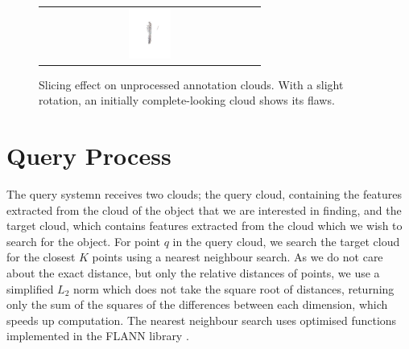 \documentclass[11pt,a4paper]{kth-mag}
\begin{document}
\begin{figure}
{\begin{tabular}{c}
      \includegraphics[width=0.2\textwidth]{images/annotations/slices/hanger_jacket_side}
    \end{tabular}
  }
  \caption{Slicing effect on unprocessed annotation clouds. With a slight
    rotation, an initially complete-looking cloud shows its
    flaws.}
  \label{fig:slicing}
\end{figure}

\section{Query Process}

The query systemn receives two clouds; the query cloud, containing the features
extracted from the cloud of the object that we are interested in finding, and
the target cloud, which contains features extracted from the cloud which we wish
to search for the object. For point $q$ in the query cloud, we search the target
cloud for the closest $K$ points using a nearest neighbour search. As we do not
care about the exact distance, but only the relative distances of points, we use
a simplified $L_2$ norm which does not take the square root of distances,
returning only the sum of the squares of the differences between each dimension,
which speeds up computation. The nearest neighbour search uses optimised
functions implemented in the FLANN library \cite{muja2009fast,
  muja2014scalable}.
\end{document}
